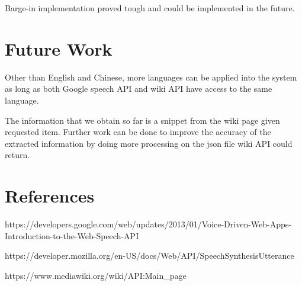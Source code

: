 \documentclass[11pt,a4paper]{article}
\begin{document}
Barge-in implementation proved tough and could be implemented in the future.
\section{Future Work}
Other than English and Chinese, more languages can be applied into the system as long as both Google speech API and wiki API have access to the same language.

The information that we obtain so far is a snippet from the wiki page given requested item. Further work can be done to improve the accuracy of the extracted information by doing more processing on the json file wiki API could return. 

\section{References}
https://developers.google.com/web/updates/2013/01/Voice-Driven-Web-Apps-Introduction-to-the-Web-Speech-API

https://developer.mozilla.org/en-US/docs/Web/API/SpeechSynthesisUtterance

https://www.mediawiki.org/wiki/API:Main\_page

%
%
\end{document}
